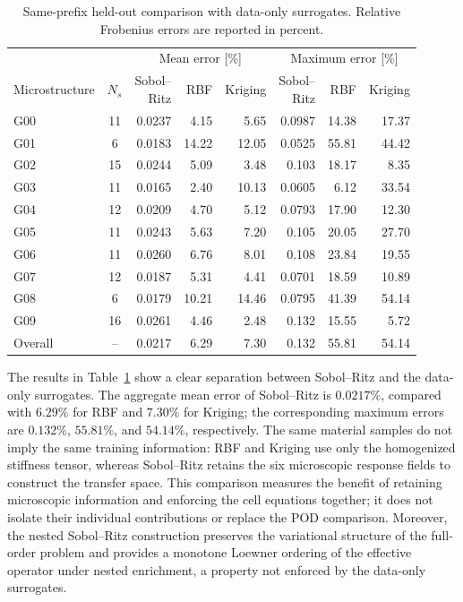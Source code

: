 \documentclass[pdflatex,sn-basic,Numbered]{sn-jnl}
\begin{document}
\begin{table}[t]
\caption{Same-prefix held-out comparison with data-only surrogates.
Relative Frobenius errors are reported in percent.}
\label{tab:surrogate_baselines}
\setlength{\tabcolsep}{4pt}
\renewcommand{\arraystretch}{1.05}
\begin{tabular}{@{}lcrrr@{\hspace{8pt}}rrr@{}}
\toprule
& &
\multicolumn{3}{c}{Mean error [\%]} &
\multicolumn{3}{c}{Maximum error [\%]} \\
\cmidrule(lr){3-5}
\cmidrule(lr){6-8}
Microstructure &
\(N_s\) &
\shortstack{Sobol--\\Ritz} &
RBF &
Kriging &
\shortstack{Sobol--\\Ritz} &
RBF &
Kriging \\
\midrule
G00 & 11 & 0.0237 & 4.15  & 5.65  & 0.0987 & 14.38 & 17.37 \\
G01 &  6 & 0.0183 & 14.22 & 12.05 & 0.0525 & 55.81 & 44.42 \\
G02 & 15 & 0.0244 & 5.09  & 3.48  & 0.103  & 18.17 & 8.35  \\
G03 & 11 & 0.0165 & 2.40  & 10.13 & 0.0605 & 6.12  & 33.54 \\
G04 & 12 & 0.0209 & 4.70  & 5.12  & 0.0793 & 17.90 & 12.30 \\
G05 & 11 & 0.0243 & 5.63  & 7.20  & 0.105  & 20.05 & 27.70 \\
G06 & 11 & 0.0260 & 6.76  & 8.01  & 0.108  & 23.84 & 19.55 \\
G07 & 12 & 0.0187 & 5.31  & 4.41  & 0.0701 & 18.59 & 10.89 \\
G08 &  6 & 0.0179 & 10.21 & 14.46 & 0.0795 & 41.39 & 54.14 \\
G09 & 16 & 0.0261 & 4.46  & 2.48  & 0.132  & 15.55 & 5.72  \\
\midrule
Overall & -- & 0.0217 & 6.29 & 7.30 & 0.132 & 55.81 & 54.14 \\
\bottomrule
\end{tabular}
\end{table}

The results in Table~\ref{tab:surrogate_baselines} show a clear separation
between Sobol--Ritz and the data-only surrogates. The aggregate mean error of Sobol--Ritz is \(0.0217\%\), compared with \(6.29\%\) for RBF and
\(7.30\%\) for Kriging; the corresponding maximum errors are \(0.132\%\),
\(55.81\%\), and \(54.14\%\), respectively. The same material samples do not imply the same training information: RBF and
Kriging use only the homogenized stiffness tensor, whereas Sobol--Ritz retains
the six microscopic response fields to construct the transfer space. This comparison measures the benefit of retaining microscopic information
and enforcing the cell equations together; it does not isolate their
individual contributions or replace the POD comparison. Moreover, the nested Sobol--Ritz
construction preserves the variational structure of the full-order problem and
provides a monotone Loewner ordering of the effective operator under nested
enrichment, a property not enforced by the data-only surrogates.
\end{document}
